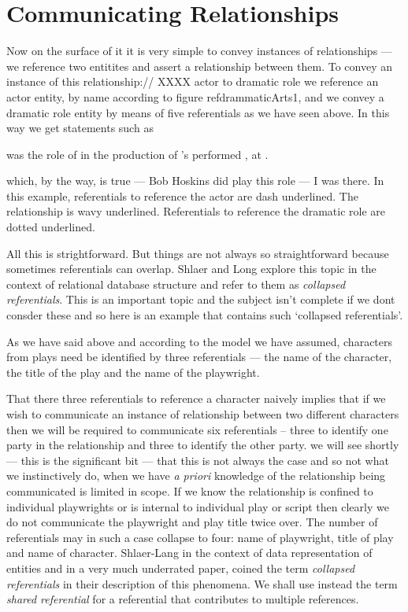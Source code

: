 
\section{Communicating Relationships}
\mynote 
Now on the surface of it it is very simple
to convey instances of relationships --- we reference two entitites and assert a relationship between them. 
To convey an instance of this relationship://
XXXX actor to dramatic role
we reference an actor entity, by name according to figure ref{drammaticArts1},
and we convey a dramatic role entity by means of five referentials as we have seen above.
In this way we get statements such as
\begin{erquote}

\parbox{9.0cm}{\linespread{1.5}\normalsize{} was  the role of  in the production of \mbox{'s}  performed \mbox{,} at .
}
\end{erquote}
which, by the way, is true  --- Bob Hoskins did play this role --- I was there.
In this example, referentials to reference the actor are dash underlined. The relationship is wavy underlined.
Referentials to reference the dramatic role are dotted underlined.

All this is strightforward. But things are not always so straightforward because sometimes referentials can overlap. 
Shlaer and Long explore this topic in the context of relational database structure and refer to them as \textit{collapsed referentials}. This is an important topic and the subject isn't complete if we dont 
consder these and so here is an example that contains such `collapsed referentials'.

As we have said above and according to the model we have assumed,
  characters from plays need be identified by three referentials
 --- the name of the character, the title of the play and the name of the playwright.

\mynote 
That there three referentials to reference a character naively implies that if we wish to communicate an instance of relationship between two different characters then we will be required to communicate six referentials
 -- three to identify one party in the relationship and three to identify the other party. 
 we will see shortly  --- this is the significant bit --- that this is not always the case and so not what we instinctively do, when we have \textit{a priori} knowledge of the relationship being communicated is limited in scope. 
 If we know the relationship is confined to individual playwrights or is internal to individual play 
 or script then clearly we do not 
  communicate the playwright and play title twice over. The number of referentials may in such a case collapse to four:
   name of playwright, title of play and name of character.
Shlaer-Lang in the context of data representation of entities and in a very much underrated paper, coined the term \textit{collapsed referentials} in
their description of this phenomena.  We shall use instead the term \textit{shared referential} for a referential that contributes to multiple references.

